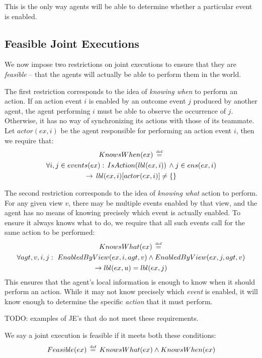 This is the only way agents will be able to determine whether a particular
event is enabled.


\subsection{Feasible Joint Executions}

We now impose two restrictions on joint executions to ensure that
they are \emph{feasible} -- that the agents will actually be able
to perform them in the world.

The first restriction corresponds to the idea of \emph{knowing when}
to perform an action. If an action event $i$ is enabled by an outcome
event $j$ produced by another agent, the agent performing $i$ must
be able to observe the occurrence of $j$. Otherwise, it has no way
of synchronizing its actions with those of its teammate. Let $actor(ex,i)$
be the agent responsible for performing an action event $i$, then
we require that:\begin{multline*}
KnowsWhen(ex)\,\stackrel{\mbox{\tiny def}}{=}\,\\
\forall i,j\in events(ex):\, IsAction(lbl(ex,i))\,\wedge j\in ens(ex,i)\\
\rightarrow\, lbl(ex,i)[actor(ex,i)]\neq\{\}\end{multline*}


The second restriction corresponds to the idea of \emph{knowing what}
action to perform. For any given view $v$, there may be multiple
events enabled by that view, and the agent has no means of knowing
precisely which event is actually enabled. To ensure it always knows
what to do, we require that all such events call for the same action
to be performed:\begin{multline*}
KnowsWhat(ex)\,\stackrel{\mbox{\tiny def}}{=}\,\\
\forall agt,v,i,j:\,\, EnabledByView(ex,i,agt,v)\wedge EnabledByView(ex,j,agt,v)\\
\rightarrow lbl(ex,u)=lbl(ex,j)\end{multline*}
 This ensures that the agent's local information is enough to know
when it should perform an action. While it may not know precisely
which \emph{event} is enabled, it will know enough to determine the
specific \emph{action} that it must perform.

TODO: examples of JE's that do not meet these requirements.

We say a joint execution is feasible if it meets both these conditions:\[
Feasible(ex)\,\stackrel{\mbox{\tiny def}}{=}\, KnowsWhat(ex)\wedge KnowsWhen(ex)\]



